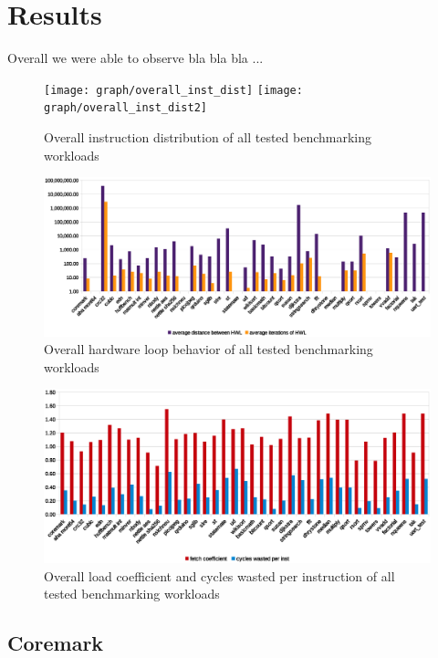 \documentclass[../bachelor_paper.tex]{subfiles}
\begin{document}
\chapter{Results}
    \label{ch:res}
    
Overall we were able to observe bla bla bla ...
\begin{figure}
    \centering
    \texttt{[image: graph/overall\_inst\_dist]}
    \texttt{[image: graph/overall\_inst\_dist2]}
    \caption{Overall instruction distribution of all tested benchmarking workloads}
    \label{fig:res/overall/inst}
\end{figure}

\begin{figure}
    \centering
    \includegraphics[width=\textwidth]{img/graph/overall_hwl.eps}
    \caption{Overall hardware loop behavior of all tested benchmarking workloads}
    \label{fig:res/overall/hwl}
\end{figure}

\begin{figure}
    \centering
    \includegraphics[width=\textwidth]{img/graph/overall_fetch_waste.eps}
    \caption{Overall load coefficient and cycles wasted per instruction of all tested benchmarking workloads}
    \label{fig:res/overall/fetch_waste}
\end{figure}

\section{Coremark}
\end{document}
